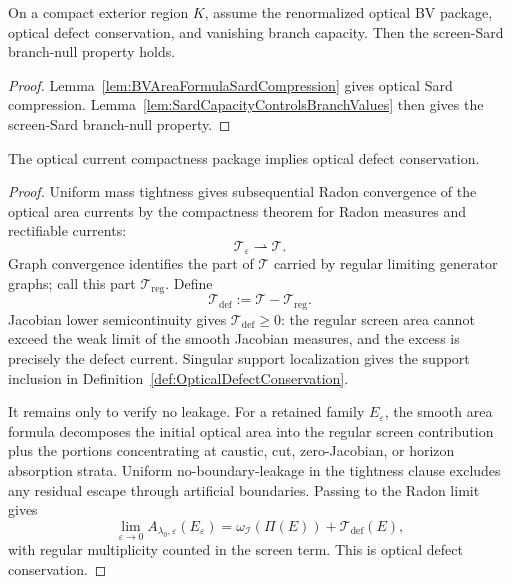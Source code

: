 \begin{theorem}\label{thm:OpticalSardCapacityBranchNull}
On a compact exterior region $K$, assume the renormalized optical BV package, optical defect conservation, and vanishing branch capacity. Then the screen-Sard branch-null property holds.
\end{theorem}

\begin{proof}
Lemma~\ref{lem:BVAreaFormulaSardCompression} gives optical Sard compression. Lemma~\ref{lem:SardCapacityControlsBranchValues} then gives the screen-Sard branch-null property.
\end{proof}

\begin{theorem}\label{thm:CompactnessPackageDefectConservation}
The optical current compactness package implies optical defect conservation.
\end{theorem}

\begin{proof}
Uniform mass tightness gives subsequential Radon convergence of the optical area currents by the compactness theorem for Radon measures and rectifiable currents:
\[
    \mathcal T_\varepsilon\rightharpoonup \mathcal T .
\]
Graph convergence identifies the part of $\mathcal T$ carried by regular limiting generator graphs; call this part $\mathcal T_{\mathrm{reg}}$. Define
\[
    \mathcal T_{\mathrm{def}}:=\mathcal T-\mathcal T_{\mathrm{reg}} .
\]
Jacobian lower semicontinuity gives $\mathcal T_{\mathrm{def}}\ge0$: the regular screen area cannot exceed the weak limit of the smooth Jacobian measures, and the excess is precisely the defect current. Singular support localization gives the support inclusion in Definition~\ref{def:OpticalDefectConservation}.

It remains only to verify no leakage. For a retained family $E_\varepsilon$, the smooth area formula decomposes the initial optical area into the regular screen contribution plus the portions concentrating at caustic, cut, zero-Jacobian, or horizon absorption strata. Uniform no-boundary-leakage in the tightness clause excludes any residual escape through artificial boundaries. Passing to the Radon limit gives
\[
    \lim_{\varepsilon\to0}A_{\lambda_0,\varepsilon}(E_\varepsilon)
    =
    \omega_{\mathscr I}(\Pi(E))
    +
    \mathcal T_{\mathrm{def}}(E),
\]
with regular multiplicity counted in the screen term. This is optical defect conservation.
\end{proof}

